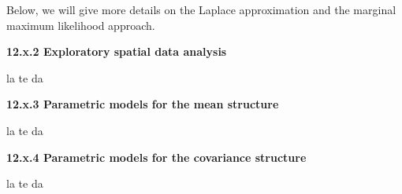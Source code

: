 \documentclass[12pt, titlepage]{article}
\begin{document}
Below, we will give more details on the Laplace approximation and the marginal maximum likelihood approach.


{\large \flushleft \textbf{12.x.2 Exploratory spatial data analysis}}

la te da



{\large \flushleft \textbf{12.x.3 Parametric models for the mean structure}}

la te da


{\large \flushleft \textbf{12.x.4 Parametric models for the covariance structure}}

la te da

\end{document}
